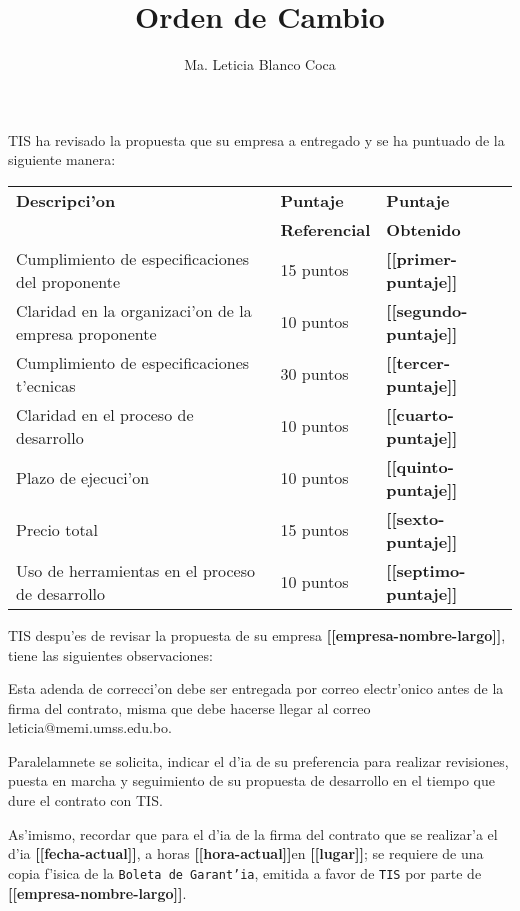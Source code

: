 \documentclass[10pt,letterpaper,twoside]{article}
\newcommand{\empresa}[0]{\textbf{[[empresa-nombre-largo]]}}
\newcommand{\dia}[0]{\textbf{[[fecha-actual]]}}
\newcommand{\hora}[0]{\textbf{[[hora-actual]]}}
\newcommand{\lugar}[0]{\textbf{[[lugar]]}}
\newcommand{\pp}[0]{\textbf{[[primer-puntaje]]}}
\newcommand{\sep}[0]{\textbf{[[segundo-puntaje]]}}
\newcommand{\tp}[0]{\textbf{[[tercer-puntaje]]}}
\newcommand{\cp}[0]{\textbf{[[cuarto-puntaje]]}}
\newcommand{\qp}[0]{\textbf{[[quinto-puntaje]]}}
\newcommand{\ssp}[0]{\textbf{[[sexto-puntaje]]}}
\newcommand{\sssp}[0]{\textbf{[[septimo-puntaje]]}}
\newcommand{\observaciones}[0]{\observacionesDetalle{[[obs-detalle-item]]}}
\begin{document}
\title{Orden de Cambio}
\author{Ma. Leticia Blanco Coca}
\maketitle


TIS ha revisado la propuesta que su empresa a entregado y se ha puntuado de la siguiente manera:

\begin{tabular}{|l|l|l|}
\hline \textbf{Descripci'on}& \textbf{Puntaje}&\textbf{Puntaje} \\
& \textbf{Referencial}&\textbf{Obtenido} \\
\hline Cumplimiento de especificaciones del proponente       & 15 puntos & \pp \\
\hline Claridad en la organizaci'on de la empresa proponente & 10 puntos & \sep \\
\hline Cumplimiento de especificaciones t'ecnicas            & 30 puntos & \tp \\ 
\hline Claridad en el proceso de desarrollo                  & 10 puntos & \cp \\
\hline Plazo de ejecuci'on                                   & 10 puntos & \qp \\
\hline Precio total                                          & 15 puntos & \ssp \\
\hline Uso de herramientas en el proceso de desarrollo       & 10 puntos & \sssp \\
\hline
\end{tabular}

TIS despu'es de revisar la propuesta de su empresa \empresa, tiene las siguientes observaciones:

\begin{enumerate}
\observaciones
\end{enumerate}

Esta adenda de correcci'on debe ser entregada por correo electr'onico antes de la firma del contrato, misma que debe hacerse llegar al correo leticia@memi.umss.edu.bo.


Paralelamnete se solicita, indicar el d'ia de su preferencia para realizar revisiones, puesta
en marcha  y 
seguimiento de su propuesta de desarrollo en el tiempo que dure el contrato con TIS.


As'imismo, recordar que para el d'ia de la firma del contrato que se realizar'a el d'ia \dia, a horas \hora en \lugar; se requiere de una copia f'isica
 de la 
\texttt{Boleta de Garant'ia}, emitida a favor de \texttt{TIS} por parte de \empresa.
\end{document}
